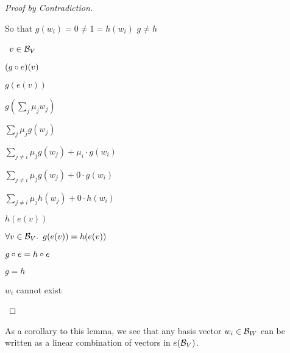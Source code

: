 \begin{lemma}
\begin{proof}[Proof by Contradiction]
\begin{itemize}
      \step
        \begin{itemize}
          \subp{\dagger}
            So that $g(w_i) = 0 \neq 1 = h(w_i)$
          \step[\imps] $g \neq h$
        \end{itemize}

      \step
        \begin{itemize}
          \subp{\ddagger}
            \Let~$v\in\mathcal{B}_{V}$
            \marginnote{\Hyp}

          \step $(g\circ e)(v)$

          \step[=] $g(e(v))$
            \marginnote{\Def-$\compose$}

          \step[=]
            $g(\sum_j\mu_jw_j)$

          \step[=]
            $\sum_j\mu_jg(w_j)$

          \step[=]
            $\sum_{j\neq i}\mu_jg(w_j) + \mu_i\cdot g(w_i)$

          \step[=]
            $\sum_{j\neq i}\mu_jg(w_j) + 0\cdot g(w_i)$
            \marginnote{$\forall$-\Elim-$\star$}

          \step[=]
            $\sum_{j\neq i}\mu_jh(w_j) + 0\cdot h(w_i)$

          \step[=]
            $h(e(v))$
        \end{itemize}

        \step[\imps]
          $\forall v\in\mathcal{B}_{V}\ldotp~g(e(v))=h(e(v))$
          \marginnote{$\forall$-\Intro}

        \step[\imps]
          $g\circ e = h\circ e$
          \marginnote{\Def-$=$}

        \step[\imps]
          $g = h$

        \step[\contras]
          $w_i$ cannot exist
          \marginnote{\Contra-$\dagger$}
          \qedhere
    \end{itemize}
  \end{proof}
\end{lemma}

As a corollary to this lemma, we see that any basis vector $w_i\in\mathcal{B}_{W}$ can be written as a linear combination of vectors in $e(\mathcal{B}_{V})$.

